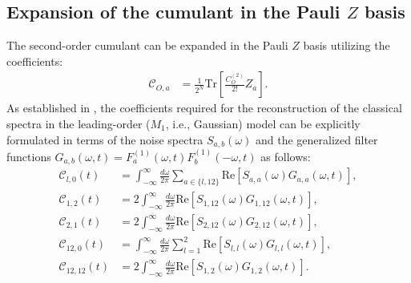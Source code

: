 \documentclass[%
 reprint,
superscriptaddress,
 amsmath,amssymb,
 aps,
pra,
floatfix,
]{revtex4-2}
\newcommand{\qk}[1]{{\color{OliveGreen}#1}}
\begin{document}
\begin{widetext}
\section{Expansion of the cumulant in the Pauli $Z$ basis}
\label{app::COs}
The second-order cumulant can be expanded in the Pauli $Z$ basis utilizing the coefficients:
\begin{align}
    \mathcal{C}_{O,a}&=\frac{1}{2^N}\text{Tr}\left[\frac{C_O^{(2)}}{2!}Z_a\right].
\end{align}
As established in \cite{PhysRevA.95.022121}, the coefficients required for the reconstruction of the classical spectra in the \qk{leading-order ($M_1$, i.e., Gaussian)} model can be explicitly formulated in terms of the noise spectra $S_{a,b}(\omega)$ and the generalized filter functions $G_{a,b}(\omega, t) = F_a^{(1)}(\omega, t)F_b^{(1)}(-\omega, t)$ as follows:
\begin{align}
    \mathcal{C}_{l,0}(t)&=\int_{-\infty}^\infty \frac{d\omega}{2\pi}\sum_{a\in \{l,12\}}\text{Re}\left[S_{a,a}(\omega)G_{a,a}(\omega, t)\right],\\
    \label{eq::c1,2}
    \mathcal{C}_{1,2}(t)&=2\int_{-\infty}^\infty \frac{d\omega}{2\pi}\text{Re}\left[S_{1,12}(\omega)G_{1,12}(\omega, t)\right],\\
    \label{eq::c2,1}
    \mathcal{C}_{2,1}(t)&=2\int_{-\infty}^\infty \frac{d\omega}{2\pi}\text{Re}\left[S_{2,12}(\omega)G_{2,12}(\omega, t)\right],\\
    \mathcal{C}_{12,0}(t)&=\int_{-\infty}^\infty \frac{d\omega}{2\pi}\sum_{l=1}^2\text{Re}\left[S_{l,l}(\omega)G_{l,l}(\omega, t)\right],\\
    \label{eq::c1212}
    \mathcal{C}_{12,12}(t)&=2\int_{-\infty}^\infty \frac{d\omega}{2\pi}\text{Re}\left[S_{1,2}(\omega)G_{1,2}(\omega,t)\right].
\end{align}
\end{widetext}
\end{document}
